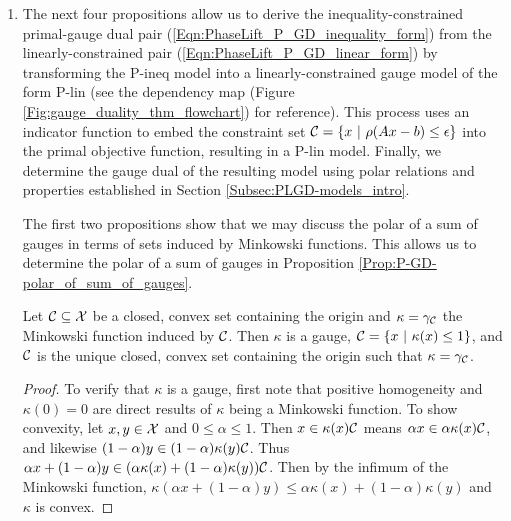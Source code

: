\begin{enumerate}
\begin{proof}
Finally, note that $\caC$ and $\caC'$ both lie in $\caX$, while $\caD = A\caC$ and $\caD'$ lie in $\caY$.  Then by Proposition \ref{Prop:antipolar_set_equalities}, the antipolar $\caC'$ has the form
\begin{equation}
\begin{array}{lll}
\caC' = \left(A^{-1} \caD \right)'	& =  &	A^* \caD' 	\\
	&	=	&		\left\{ A^*y 	\	|	\ \langle b, y \rangle - \epsilon \rho^\circ(y) \geq 1  \right\}.
\end{array}
\end{equation}
\end{proof}


\item


The next four propositions allow us to derive the inequality-constrained primal-gauge dual pair (\ref{Eqn:PhaseLift_P_GD_inequality_form}) from the linearly-constrained pair (\ref{Eqn:PhaseLift_P_GD_linear_form}) by transforming the P-ineq model into a linearly-constrained gauge model of the form P-lin (see the dependency map (Figure \ref{Fig:gauge_duality_thm_flowchart}) for reference).   This process uses an indicator function to embed the constraint set ${\mathcal C} = \{ x \ | \ \rho(Ax-b) \leq \epsilon\}$ into the primal objective function, resulting in a P-lin model.  Finally, we determine the gauge dual of the resulting model using polar relations and properties established in Section \ref{Subsec:PLGD-models_intro}.


The first two propositions show that we may discuss the polar of a sum of gauges in terms of sets induced by Minkowski functions.  This allows us to determine the polar of a sum of gauges in Proposition \ref{Prop:P-GD-polar_of_sum_of_gauges}.

\begin{prop} 			\label{Prop:P-GD-Minkowski_set_unique}
Let ${\mathcal C} \subseteq {\mathcal X}$ be a closed, convex set containing the origin and $\kappa = \gamma_{\mathcal C}$ the Minkowski function induced by $\caC$.  Then $\kappa$ is a gauge, ${\mathcal C} = \{ x \ | \ \kappa(x) \leq 1 \}$, and $\caC$ is the unique closed, convex set containing the origin such that $\kappa = \gamma_{\mathcal C}$.
\end{prop}
\begin{proof}
To verify that $\kappa$ is a gauge, first note that positive homogeneity and $\kappa(0) = 0$ are direct results of $\kappa$ being a Minkowski function.  To show convexity, let $x, y \in {\mathcal X}$ and $0 \leq \alpha \leq 1$.  Then $x \in \kappa(x) {\mathcal C}$ means $\alpha x \in \alpha \kappa(x) {\mathcal C}$, and likewise $(1-\alpha) y \in (1-\alpha) \kappa(y) {\mathcal C}$.  Thus $\alpha x + (1-\alpha)y \in (\alpha \kappa(x) + (1-\alpha) \kappa(y)) {\mathcal C}$.  Then by the infimum of the Minkowski function, $\kappa(\alpha x + (1-\alpha) y) \leq \alpha \kappa(x) + (1-\alpha) \kappa(y)$ and $\kappa$ is convex.


\end{proof}
\end{enumerate}
